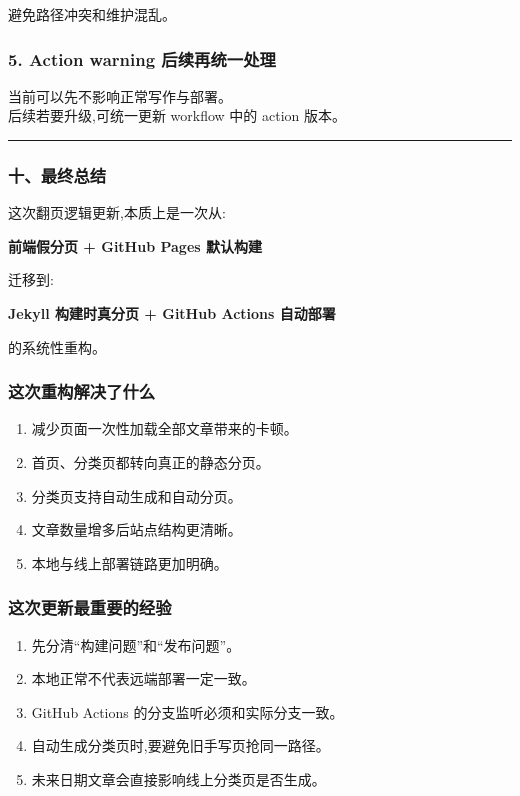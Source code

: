\documentclass[lang=cn,scheme=chinese,color=blue,device=normal,toc=onecol,math=cm]{elegantbook}
\begin{document}
避免路径冲突和维护混乱。\par


\subsubsection{5. Action warning 后续再统一处理}


当前可以先不影响正常写作与部署。\\ 后续若要升级,可统一更新 workflow 中的 action 版本。\par


\medskip\hrule\medskip


\subsubsection{十、最终总结}


这次翻页逻辑更新,本质上是一次从:\par


\textbf{前端假分页 + GitHub Pages 默认构建}\par


迁移到:\par


\textbf{Jekyll 构建时真分页 + GitHub Actions 自动部署}\par


的系统性重构。\par


\subsubsection{这次重构解决了什么}


\begin{enumerate}
\item 减少页面一次性加载全部文章带来的卡顿。
\item 首页、分类页都转向真正的静态分页。
\item 分类页支持自动生成和自动分页。
\item 文章数量增多后站点结构更清晰。
\item 本地与线上部署链路更加明确。
\end{enumerate}


\subsubsection{这次更新最重要的经验}


\begin{enumerate}
\item 先分清“构建问题”和“发布问题”。
\item 本地正常不代表远端部署一定一致。
\item GitHub Actions 的分支监听必须和实际分支一致。
\item 自动生成分类页时,要避免旧手写页抢同一路径。
\item 未来日期文章会直接影响线上分类页是否生成。
\end{enumerate}
\end{document}
